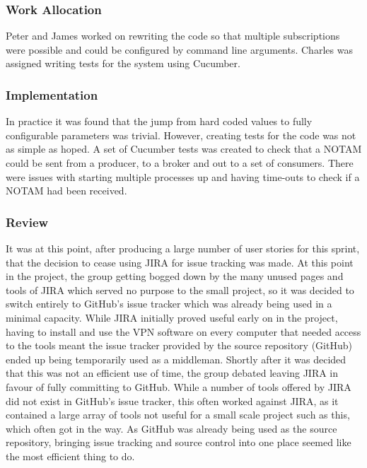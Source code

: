 \documentclass[a4paper, 12pt, twoside]{article}
\begin{document}
\subsubsection{Work Allocation}

Peter and James worked on rewriting the code so that multiple subscriptions were possible and could be configured by command line arguments. Charles was assigned writing tests for the system using Cucumber.

\subsubsection{Implementation}

In practice it was found that the jump from hard coded values to fully configurable parameters was trivial. However, creating tests for the code was not as simple as hoped. A set of Cucumber tests was created to check that a NOTAM could be sent from a producer, to a broker and out to a set of consumers. There were issues with starting multiple processes up and having time-outs to check if a NOTAM had been received.

\subsubsection{Review}

It was at this point, after producing a large number of user stories for this sprint, that the decision to cease using JIRA for issue tracking was made. At this point in the project, the group getting bogged down by the many unused pages and tools of JIRA which served no purpose to the small project, so it was decided to switch entirely to GitHub's issue tracker which was already being used in a minimal capacity. While JIRA initially proved useful early on in the project, having to install and use the VPN software on every computer that needed access to the tools meant the issue tracker provided by the source repository (GitHub) ended up being temporarily used as a middleman. Shortly after it was decided that this was not an efficient use of time, the group debated leaving JIRA in favour of fully committing to GitHub. While a number of tools offered by JIRA did not exist in GitHub's issue tracker, this often worked against JIRA, as it contained a large array of tools not useful for a small scale project such as this, which often got in the way. As GitHub was already being used as the source repository, bringing issue tracking and source control into one place seemed like the most efficient thing to do.
\end{document}
